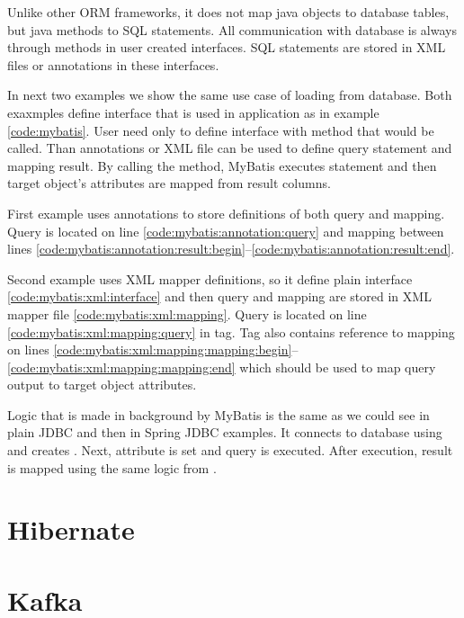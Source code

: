 Unlike other ORM frameworks, it does not map java objects to database tables, but java methods
to SQL statements. All communication with database is always through methods in user created interfaces.
SQL statements are stored in XML files or annotations in these interfaces.

In next two examples we show the same use case of loading  from database.
Both exaxmples define interface  that is used in application as in
example \ref{code:mybatis}. User need only to define interface with method that would be
called. Than annotations or XML file can be used to define query statement and mapping
result. By calling the method, MyBatis executes statement and then target object's attributes are
mapped from result columns.


First example uses annotations to store definitions of both query and mapping.
Query is located on line \ref{code:mybatis:annotation:query} and mapping between lines
\ref{code:mybatis:annotation:result:begin}--\ref{code:mybatis:annotation:result:end}.

Second example uses XML mapper definitions, so it define plain interface \ref{code:mybatis:xml:interface}
and then query and mapping are stored in XML mapper file \ref{code:mybatis:xml:mapping}.
Query is located on line \ref{code:mybatis:xml:mapping:query} in  tag.
Tag also contains reference to  mapping on lines
\ref{code:mybatis:xml:mapping:mapping:begin}--\ref{code:mybatis:xml:mapping:mapping:end}
which should be used to map query output to target object attributes. 

Logic that is made in background by MyBatis is the same as we could see in plain JDBC
and then in Spring JDBC examples. It connects to database using 
and creates . Next,  attribute is set and
query is executed. After execution, result is mapped using the same logic from .







\section{Hibernate}



\section{Kafka}


